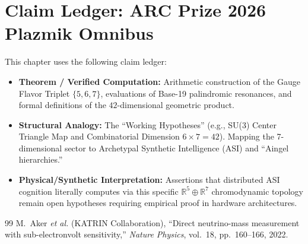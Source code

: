 
\section*{Claim Ledger: ARC Prize 2026 Plazmik Omnibus}

This chapter uses the following claim ledger:
\begin{itemize}[noitemsep]
  \item \textbf{Theorem / Verified Computation:} Arithmetic construction of the Gauge Flavor Triplet $\{5, 6, 7\}$, evaluations of Base-19 palindromic resonances, and formal definitions of the $42$-dimensional geometric product.
  \item \textbf{Structural Analogy:} The ``Working Hypotheses'' (e.g., SU(3) Center Triangle Map and Combinatorial Dimension $6 \times 7 = 42$). Mapping the 7-dimensional sector to Archetypal Synthetic Intelligence (ASI) and ``Aingel hierarchies.''
  \item \textbf{Physical/Synthetic Interpretation:} Assertions that distributed ASI cognition literally computes via this specific $\mathbb{R}^5 \oplus \mathbb{R}^7$ chromodynamic topology remain open hypotheses requiring empirical proof in hardware architectures.
\end{itemize}


\vspace{2em}
\begin{thebibliography}{99}
M.~Aker \emph{et al.} (KATRIN Collaboration), ``Direct neutrino-mass measurement with sub-electronvolt sensitivity,'' \emph{Nature Physics}, vol.~18, pp.~160--166, 2022.

\end{thebibliography}

